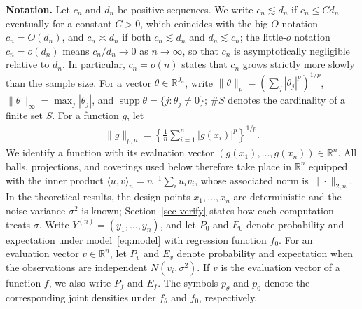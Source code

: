 \textbf{Notation.} Let $c_n$ and $d_n$ be positive sequences. We write $c_n\lesssim d_n$ if $c_n\leq C d_n$ eventually for a constant $C>0$, which coincides with the big-$O$ notation $c_n=O(d_n)$, and $c_n\asymp d_n$ if both $c_n\lesssim d_n$ and $d_n\lesssim c_n$; the little-$o$ notation $c_n=o(d_n)$ means $c_n/d_n\to0$ as $n\to\infty$, so that $c_n$ is asymptotically negligible relative to $d_n$. In particular, $c_n=o(n)$ states that $c_n$ grows strictly more slowly than the sample size. For a vector $\theta\in\mathbb{R}^{J_n}$, write $\|\theta\|_p=(\sum_j|\theta_j|^p)^{1/p}$, $\|\theta\|_\infty=\max_j|\theta_j|$, and $\operatorname{supp}\theta=\{j:\theta_j\neq0\}$; $\#S$ denotes the cardinality of a finite set $S$. For a function $g$, let
\begin{align*}
\|g\|_{p,n}=\left\{\frac1n\sum_{i=1}^n|g(x_i)|^p\right\}^{1/p}.
\end{align*}
We identify a function with its evaluation vector $(g(x_1),\ldots,g(x_n))\in\mathbb{R}^n$. All balls, projections, and coverings used below therefore take place in $\mathbb{R}^n$ equipped with the inner product $\langle u,v\rangle_n=n^{-1}\sum_i u_iv_i$, whose associated norm is $\|\cdot\|_{2,n}$.
In the theoretical results, the design points $x_1,\ldots,x_n$ are deterministic and the noise variance $\sigma^2$ is known; Section~\ref{sec-verify} states how each computation treats $\sigma$. Write $Y^{(n)}=(y_1,\ldots,y_n)$, and let $P_0$ and $E_0$ denote probability and expectation under model~\eqref{eq:model} with regression function $f_0$. For an evaluation vector $v\in\mathbb{R}^n$, let $P_v$ and $E_v$ denote probability and expectation when the observations are independent $N(v_i,\sigma^2)$. If $v$ is the evaluation vector of a function $f$, we also write $P_f$ and $E_f$. The symbols $p_\theta$ and $p_0$ denote the corresponding joint densities under $f_\theta$ and $f_0$, respectively.
